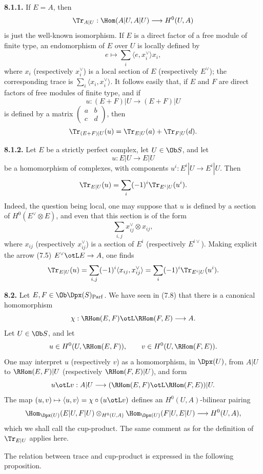 \documentclass[11pt]{article}
\newcommand{\Parf}{\operatorname{Parf}}
\begin{document}
\textbf{8.1.1.} If \(E=A\), then
\[
  \Tr_{A|U}:\Hom(A|U,A|U)\longrightarrow H^0(U,A)
\]
is just the well-known isomorphism. If \(E\) is a direct factor of a free module of finite type, an endomorphism of \(E\) over \(U\) is locally defined by
\[
  e\longmapsto \sum_i\langle e,x_i^\vee\rangle x_i,
\]
where \(x_i\) (respectively \(x_i^\vee\)) is a local section of \(E\) (respectively \(E^\vee\)); the corresponding trace is \(\sum_i\langle x_i,x_i^\vee\rangle\). It follows easily that, if \(E\) and \(F\) are direct factors of free modules of finite type, and if
\[
  u:(E+F)|U\longrightarrow(E+F)|U
\]
is defined by a matrix \(\begin{pmatrix}a&b\\ c&d\end{pmatrix}\), then
\[
  \Tr_{(E+F)|U}(u)=\Tr_{E|U}(a)+\Tr_{F|U}(d).
\]

\textbf{8.1.2.} Let \(E\) be a strictly perfect complex, let \(U\in\Ob S\), and let
\[
  u:E|U\longrightarrow E|U
\]
be a homomorphism of complexes, with components \(u^i:E^i|U\to E^i|U\). Then
\[
  \Tr_{E|U}(u)=\sum_i(-1)^i\Tr_{E^i|U}(u^i).
\]
Indeed, the question being local, one may suppose that \(u\) is defined by a section of \(H^0(E^\vee\otimes E)\), and even that this section is of the form
\[
  \sum_{i,j}x_{ij}^\vee\otimes x_{ij},
\]
where \(x_{ij}\) (respectively \(x_{ij}^\vee\)) is a section of \(E^i\) (respectively \(E^{i\vee}\)). Making explicit the arrow (7.5) \(E^\vee\otL E\to A\), one finds
\[
  \Tr_{E|U}(u)=\sum_{i,j}(-1)^i\langle x_{ij},x_{ij}^\vee\rangle
  =\sum_i(-1)^i\Tr_{E^i|U}(u^i).
\]

\textbf{8.2.} Let \(E,F\in\Ob\Dpx(S)_{\Parf}\). We have seen in (7.8) that there is a canonical homomorphism
\[
  \chi:\RHom(E,F)\otL\RHom(F,E)\longrightarrow A.
\]
Let \(U\in\Ob S\), and let
\[
  u\in H^0(U,\RHom(E,F)),\qquad v\in H^0(U,\RHom(F,E)).
\]
One may interpret \(u\) (respectively \(v\)) as a homomorphism, in \(\Dpx(U)\), from \(A|U\) to \(\RHom(E,F)|U\) (respectively \(\RHom(F,E)|U\)), and form
\[
  u\otL v:A|U\longrightarrow(\RHom(E,F)\otL\RHom(F,E))|U.
\]
The map \((u,v)\mapsto\langle u,v\rangle=\chi\circ(u\otL v)\) defines an \(H^0(U,A)\)-bilinear pairing
\[
  \Hom_{\Dpx(U)}(E|U,F|U)\otimes_{H^0(U,A)}\Hom_{\Dpx(U)}(F|U,E|U)
  \longrightarrow H^0(U,A),
\]
which we shall call the cup-product. The same comment as for the definition of \(\Tr_{E|U}\) applies here.

The relation between trace and cup-product is expressed in the following proposition.
\end{document}
